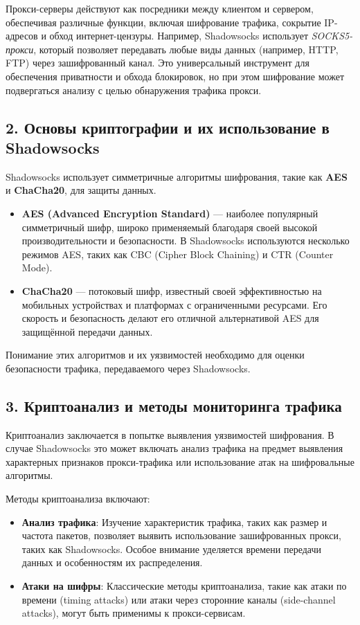 \documentclass[a4paper,12pt]{article}
\begin{document}
Прокси-серверы действуют как посредники между клиентом и сервером, обеспечивая различные функции, включая шифрование трафика, сокрытие IP-адресов и обход интернет-цензуры. Например, Shadowsocks использует \textit{SOCKS5-прокси}, который позволяет передавать любые виды данных (например, HTTP, FTP) через зашифрованный канал. Это универсальный инструмент для обеспечения приватности и обхода блокировок, но при этом шифрование может подвергаться анализу с целью обнаружения трафика прокси.

\subsection*{2. Основы криптографии и их использование в Shadowsocks}

Shadowsocks использует симметричные алгоритмы шифрования, такие как \textbf{AES} и \textbf{ChaCha20}, для защиты данных. 

\begin{itemize}
    \item \textbf{AES (Advanced Encryption Standard)} --- наиболее популярный симметричный шифр, широко применяемый благодаря своей высокой производительности и безопасности. В Shadowsocks используются несколько режимов AES, таких как CBC (Cipher Block Chaining) и CTR (Counter Mode).
    \item \textbf{ChaCha20} --- потоковый шифр, известный своей эффективностью на мобильных устройствах и платформах с ограниченными ресурсами. Его скорость и безопасность делают его отличной альтернативой AES для защищённой передачи данных.
\end{itemize}

Понимание этих алгоритмов и их уязвимостей необходимо для оценки безопасности трафика, передаваемого через Shadowsocks.

\subsection*{3. Криптоанализ и методы мониторинга трафика}

Криптоанализ заключается в попытке выявления уязвимостей шифрования. В случае Shadowsocks это может включать анализ трафика на предмет выявления характерных признаков прокси-трафика или использование атак на шифровальные алгоритмы.

Методы криптоанализа включают:

\begin{itemize}
    \item \textbf{Анализ трафика}: Изучение характеристик трафика, таких как размер и частота пакетов, позволяет выявить использование зашифрованных прокси, таких как Shadowsocks. Особое внимание уделяется времени передачи данных и особенностям их распределения.
    \item \textbf{Атаки на шифры}: Классические методы криптоанализа, такие как атаки по времени (timing attacks) или атаки через сторонние каналы (side-channel attacks), могут быть применимы к прокси-сервисам.
\end{itemize}
\end{document}

